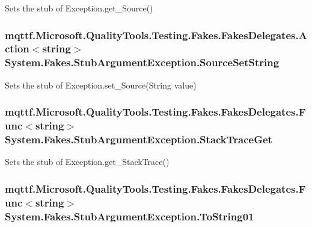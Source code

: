 Sets the stub of Exception.\-get\-\_\-\-Source()

\hypertarget{class_system_1_1_fakes_1_1_stub_argument_exception_afa00c3a689e31c733c139dc01e69babe}{
\subsubsection[{Source\-Set\-String}]{\setlength{\rightskip}{0pt plus 5cm}mqttf.\-Microsoft.\-Quality\-Tools.\-Testing.\-Fakes.\-Fakes\-Delegates.\-Action$<$string$>$ System.\-Fakes.\-Stub\-Argument\-Exception.\-Source\-Set\-String}}\label{class_system_1_1_fakes_1_1_stub_argument_exception_afa00c3a689e31c733c139dc01e69babe}


Sets the stub of Exception.\-set\-\_\-\-Source(\-String value)

\hypertarget{class_system_1_1_fakes_1_1_stub_argument_exception_adf4de45cfeb3db3af8342af8c79c8a0e}{
\subsubsection[{Stack\-Trace\-Get}]{\setlength{\rightskip}{0pt plus 5cm}mqttf.\-Microsoft.\-Quality\-Tools.\-Testing.\-Fakes.\-Fakes\-Delegates.\-Func$<$string$>$ System.\-Fakes.\-Stub\-Argument\-Exception.\-Stack\-Trace\-Get}}\label{class_system_1_1_fakes_1_1_stub_argument_exception_adf4de45cfeb3db3af8342af8c79c8a0e}


Sets the stub of Exception.\-get\-\_\-\-Stack\-Trace()

\hypertarget{class_system_1_1_fakes_1_1_stub_argument_exception_ae5130a3ea6d3bd87708677c7cceb533a}{
\subsubsection[{To\-String01}]{\setlength{\rightskip}{0pt plus 5cm}mqttf.\-Microsoft.\-Quality\-Tools.\-Testing.\-Fakes.\-Fakes\-Delegates.\-Func$<$string$>$ System.\-Fakes.\-Stub\-Argument\-Exception.\-To\-String01}}\label{class_system_1_1_fakes_1_1_stub_argument_exception_ae5130a3ea6d3bd87708677c7cceb533a}


